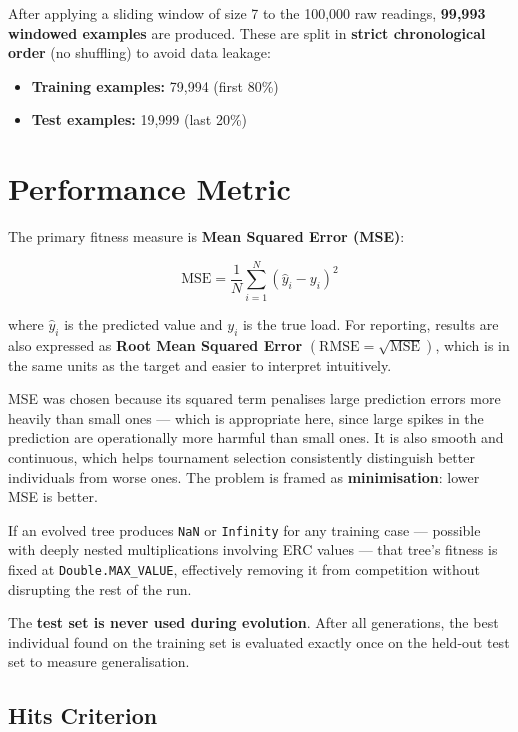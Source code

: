\documentclass[12pt,a4paper]{article}
\begin{document}
After applying a sliding window of size 7 to the 100,000 raw readings, \textbf{99,993 windowed examples} are produced. These are split in \textbf{strict chronological order} (no shuffling) to avoid data leakage:

\begin{itemize}
    \item \textbf{Training examples:} 79,994 (first 80\%)
    \item \textbf{Test examples:} 19,999 (last 20\%)
\end{itemize}

\section{Performance Metric}

The primary fitness measure is \textbf{Mean Squared Error (MSE)}:

\[
\text{MSE} = \frac{1}{N} \sum_{i=1}^{N} \left(\hat{y}_i - y_i\right)^2
\]

where $\hat{y}_i$ is the predicted value and $y_i$ is the true load. For reporting, results are also expressed as \textbf{Root Mean Squared Error} $(\text{RMSE} = \sqrt{\text{MSE}})$, which is in the same units as the target and easier to interpret intuitively.

MSE was chosen because its squared term penalises large prediction errors more heavily than small ones --- which is appropriate here, since large spikes in the prediction are operationally more harmful than small ones. It is also smooth and continuous, which helps tournament selection consistently distinguish better individuals from worse ones. The problem is framed as \textbf{minimisation}: lower MSE is better.

If an evolved tree produces \texttt{NaN} or \texttt{Infinity} for any training case --- possible with deeply nested multiplications involving ERC values --- that tree's fitness is fixed at \texttt{Double.MAX\_VALUE}, effectively removing it from competition without disrupting the rest of the run.

The \textbf{test set is never used during evolution}. After all generations, the best individual found on the training set is evaluated exactly once on the held-out test set to measure generalisation.

\subsection*{Hits Criterion}
\end{document}
